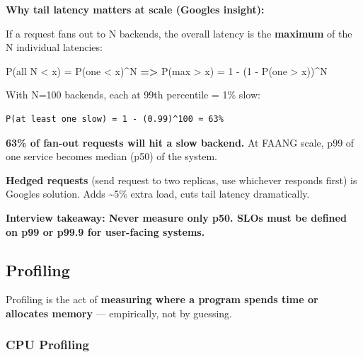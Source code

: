 \documentclass[11pt]{article}
\newenvironment{Shaded}{\begin{snugshade}}{\end{snugshade}}
\newcommand{\DecValTok}[1]{\textcolor[rgb]{0.96,0.45,0.00}{#1}}
\newcommand{\FunctionTok}[1]{\textcolor[rgb]{0.56,0.27,0.68}{#1}}
\newcommand{\KeywordTok}[1]{\textcolor[rgb]{0.81,0.81,0.76}{\textbf{#1}}}
\newcommand{\NormalTok}[1]{\textcolor[rgb]{0.81,0.81,0.76}{#1}}
\newcommand{\OperatorTok}[1]{\textcolor[rgb]{0.81,0.81,0.76}{#1}}
\begin{document}
\textbf{Why tail latency matters at scale (Google\textquotesingle s insight):}

If a request fans out to N backends, the overall latency is the \textbf{maximum} of the N individual latencies:


\begin{Shaded}
\begin{Highlighting}[]
\FunctionTok{P}\NormalTok{(all N }\OperatorTok{\textless{}}\NormalTok{ x) }\OperatorTok{=} \FunctionTok{P}\NormalTok{(one }\OperatorTok{\textless{}}\NormalTok{ x)}\OperatorTok{\^{}}\NormalTok{N}
\KeywordTok{=\textgreater{}} \FunctionTok{P}\NormalTok{(max }\OperatorTok{\textgreater{}}\NormalTok{ x) }\OperatorTok{=} \DecValTok{1} \OperatorTok{{-}}\NormalTok{ (}\DecValTok{1} \OperatorTok{{-}} \FunctionTok{P}\NormalTok{(one }\OperatorTok{\textgreater{}}\NormalTok{ x))}\OperatorTok{\^{}}\NormalTok{N}
\end{Highlighting}
\end{Shaded}

With N=100 backends, each at 99th percentile = 1\% slow:

\setcodelang{}

\begin{verbatim}
P(at least one slow) = 1 - (0.99)^100 ≈ 63%
\end{verbatim}

\textbf{63\% of fan-out requests will hit a slow backend.} At FAANG scale, p99 of one service becomes median (p50) of the system.

\textbf{Hedged requests} (send request to two replicas, use whichever responds first) is Google\textquotesingle s solution. Adds \textasciitilde5\% extra load, cuts tail latency dramatically.

\textbf{Interview takeaway: Never measure only p50. SLOs must be defined on p99 or p99.9 for user-facing systems.}

\subsection{Profiling}\label{profiling}

Profiling is the act of \textbf{measuring where a program spends time or allocates memory} --- empirically, not by guessing.

\subsubsection{CPU Profiling}\label{cpu-profiling}
\end{document}
